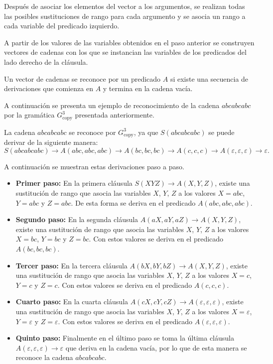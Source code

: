 \documentclass{report}
\theoremstyle{definition}
\theoremstyle{plain}
\theoremstyle{remark}
\begin{document}
Después de asociar los elementos del vector a los argumentos, se
realizan todas las posibles sustituciones de rango para cada argumento y
se asocia un rango a cada variable del predicado izquierdo.

A partir de los valores de las variables obtenidos en el paso anterior
se construyen vectores de cadenas con los que se instancian las
variables de los predicados del lado derecho de la cláusula.

Un vector de cadenas se reconoce por un predicado $A$ si existe una
secuencia de derivaciones que comienza en $A$ y termina en la cadena
vacía.

A continuación se presenta un ejemplo de reconocimiento de la cadena
$abcabcabc$ por la gramática $G_{\mathrm{copy}}^3$ presentada
anteriormente.

La cadena $abcabcabc$ se reconoce por $G_{\mathrm{copy}}^3$, ya que
$S(abcabcabc)$ se puede derivar de la siguiente manera:
\[
  S(abcabcabc) \to A(abc, abc, abc) \to A(bc, bc, bc) \to A(c, c, c)
  \to A(\varepsilon, \varepsilon, \varepsilon) \to \varepsilon.
\]

A continuación se muestran estas derivaciones paso a paso.

\begin{itemize}
  \item \textbf{Primer paso:} En la primera cláusula
    $S(XYZ) \to A(X, Y, Z)$, existe una sustitución de rango que asocia
    las variables $X$, $Y$, $Z$ a los valores $X = abc$, $Y = abc$ y
    $Z = abc$. De esta forma se deriva en el predicado $A(abc, abc,
    abc)$.
  \item \textbf{Segundo paso:} En la segunda cláusula
    $A(aX, aY, aZ) \to A(X, Y, Z)$, existe una sustitución de rango que
    asocia las variables $X$, $Y$, $Z$ a los valores $X = bc$, $Y = bc$
    y $Z = bc$. Con estos valores se deriva en el predicado
    $A(bc, bc, bc)$.
  \item \textbf{Tercer paso:} En la tercera cláusula
    $A(bX, bY, bZ) \to A(X, Y, Z)$, existe una sustitución de rango que
    asocia las variables $X$, $Y$, $Z$ a los valores $X = c$, $Y = c$ y
    $Z = c$. Con estos valores se deriva en el predicado $A(c, c, c)$.
  \item \textbf{Cuarto paso:} En la cuarta cláusula
    $A(cX, cY, cZ) \to A(\varepsilon, \varepsilon, \varepsilon)$,
    existe una sustitución de rango que asocia las variables $X$, $Y$,
    $Z$ a los valores $X = \varepsilon$, $Y = \varepsilon$ y
    $Z = \varepsilon$. Con estos valores se deriva en el predicado
    $A(\varepsilon, \varepsilon, \varepsilon)$.
  \item \textbf{Quinto paso:} Finalmente en el último paso se toma la
    última cláusula $A(\varepsilon, \varepsilon, \varepsilon) \to
    \varepsilon$ que deriva en la cadena vacía, por lo que de esta
    manera se reconoce la cadena $abcabcabc$.
\end{itemize}
\end{document}

